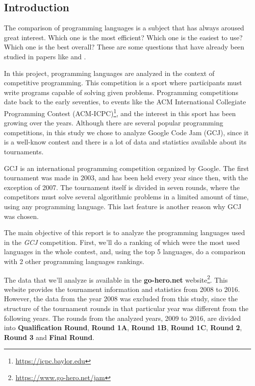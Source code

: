 \documentclass{article}
\begin{document}
\begin{multicols*}{2}


\section{Introduction}
The comparison of programming languages is a subject that has always aroused great interest. Which one is the most efficient? Which one is the easiest to use? Which one is the best overall? These are some questions that have already been studied in papers like \cite{open_source_proj} and \cite{rosetta}.

In this project, programming languages are analyzed in the context of competitive programming.
This competition is a sport where participants must write programs capable of solving given problems\cite{wiki_comp}. Programming competitions date back to the early seventies, to events like the ACM International Collegiate Programming Contest (ACM-ICPC)\footnote{\url{https://icpc.baylor.edu}}, and the interest in this sport has been growing over the years.
Although there are several popular programming competitions, in this study we chose to analyze Google Code Jam (GCJ), since it is a well-know contest and there is a lot of data and statistics available about its tournaments.

GCJ is an international programming competition\cite{gcj} organized by Google.
The first tournament was made in 2003, and has been held every year since then, with the exception of 2007. The tournament itself is divided in seven rounds, where the competitors must solve several algorithmic problems in a limited amount of time, using any programming language. This last feature is another reason why GCJ was chosen.


The main objective of this report is to analyze the programming languages used in the \textit{GCJ} competition. First, we'll do a ranking of which were the most used languages in the whole contest, and, using the top 5 languages, do a comparison with 2 other programming languages rankings.

The data that we'll analyze is available in the \textbf{go-hero.net} website\footnote{\url{https://www.go-hero.net/jam}}. This website provides the tournament information\cite{go-hero} and statistics from 2008 to 2016. However, the data from the year 2008 was excluded from this study, since the structure of the tournament rounds in that particular year was different from the following years. The rounds from the analyzed years, 2009 to 2016, are divided into \textbf{Qualification Round}, \textbf{Round 1A}, \textbf{Round 1B}, \textbf{Round 1C}, \textbf{Round 2}, \textbf{Round 3} and \textbf{Final Round}.


\end{multicols*}
\end{document}
